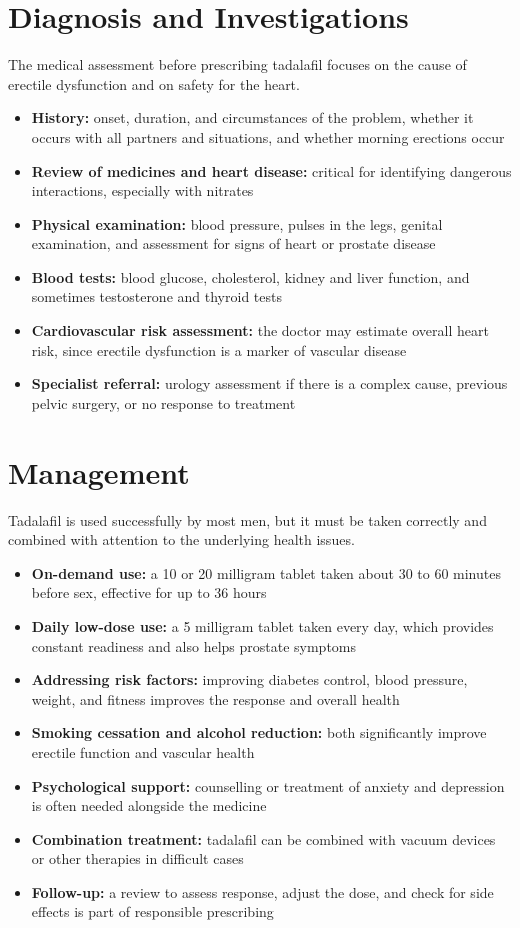 \section*{Diagnosis and Investigations}
The medical assessment before prescribing tadalafil focuses on the cause of erectile dysfunction and on safety for the heart.

\begin{itemize}
    \item \textbf{History:} onset, duration, and circumstances of the problem, whether it occurs with all partners and situations, and whether morning erections occur
    \item \textbf{Review of medicines and heart disease:} critical for identifying dangerous interactions, especially with nitrates
    \item \textbf{Physical examination:} blood pressure, pulses in the legs, genital examination, and assessment for signs of heart or prostate disease
    \item \textbf{Blood tests:} blood glucose, cholesterol, kidney and liver function, and sometimes testosterone and thyroid tests
    \item \textbf{Cardiovascular risk assessment:} the doctor may estimate overall heart risk, since erectile dysfunction is a marker of vascular disease
    \item \textbf{Specialist referral:} urology assessment if there is a complex cause, previous pelvic surgery, or no response to treatment
\end{itemize}

\section*{Management}
Tadalafil is used successfully by most men, but it must be taken correctly and combined with attention to the underlying health issues.

\begin{itemize}
    \item \textbf{On-demand use:} a 10 or 20 milligram tablet taken about 30 to 60 minutes before sex, effective for up to 36 hours
    \item \textbf{Daily low-dose use:} a 5 milligram tablet taken every day, which provides constant readiness and also helps prostate symptoms
    \item \textbf{Addressing risk factors:} improving diabetes control, blood pressure, weight, and fitness improves the response and overall health
    \item \textbf{Smoking cessation and alcohol reduction:} both significantly improve erectile function and vascular health
    \item \textbf{Psychological support:} counselling or treatment of anxiety and depression is often needed alongside the medicine
    \item \textbf{Combination treatment:} tadalafil can be combined with vacuum devices or other therapies in difficult cases
    \item \textbf{Follow-up:} a review to assess response, adjust the dose, and check for side effects is part of responsible prescribing
\end{itemize}

